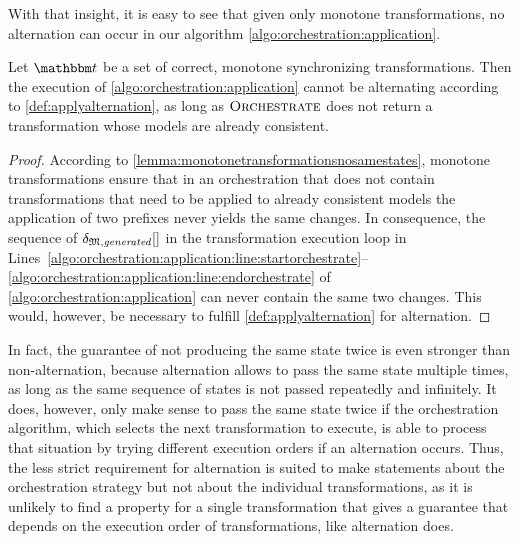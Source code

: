 With that insight, it is easy to see that given only monotone transformations, no alternation can occur in our algorithm \autoref{algo:orchestration:application}.
\begin{theorem}
    Let $\transformationset{T}$ be a set of correct, monotone synchronizing transformations.
    Then the execution of \autoref{algo:orchestration:application} cannot be alternating according to \autoref{def:applyalternation}, as long as $\textsc{Orchestrate}$ does not return a transformation whose models are already consistent.
\end{theorem}
\begin{proof}
    According to \autoref{lemma:monotonetransformationsnosamestates}, monotone transformations ensure that in an orchestration that does not contain transformations that need to be applied to already consistent models the application of two prefixes never yields the same changes.
    In consequence, the sequence of $\applyalggenerated$ in the transformation execution loop in 
    Lines~\ref{algo:orchestration:application:line:startorchestrate}--\ref{algo:orchestration:application:line:endorchestrate} of \autoref{algo:orchestration:application} can never contain the same two changes.
    This would, however, be necessary to fulfill \autoref{def:applyalternation} for alternation.
\end{proof}

In fact, the guarantee of not producing the same state twice is even stronger than non-alternation, because alternation allows to pass the same state multiple times, as long as the same sequence of states is not passed repeatedly and infinitely.
It does, however, only make sense to pass the same state twice if the orchestration algorithm, which selects the next transformation to execute, is able to process that situation by trying different execution orders if an alternation occurs.
Thus, the less strict requirement for alternation is suited to make statements about the orchestration strategy but not about the individual transformations, as it is unlikely to find a property for a single transformation that gives a guarantee that depends on the execution order of transformations, like alternation does.

